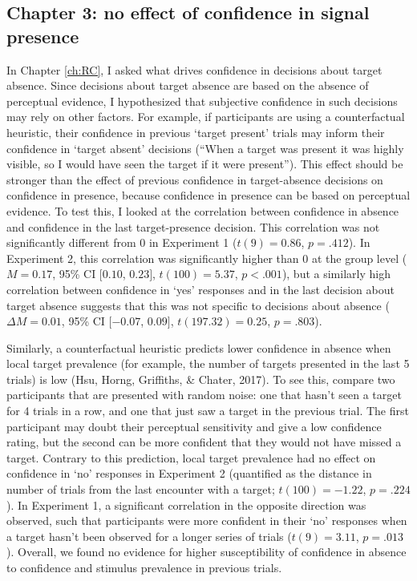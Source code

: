 \documentclass[12pt,twoside]{reedthesis}
\begin{document}
\hypertarget{chapter-3-no-effect-of-confidence-in-signal-presence}{%
\subsection*{Chapter 3: no effect of confidence in signal presence}\label{chapter-3-no-effect-of-confidence-in-signal-presence}}

In Chapter \ref{ch:RC}, I asked what drives confidence in decisions about target absence. Since decisions about target absence are based on the absence of perceptual evidence, I hypothesized that subjective confidence in such decisions may rely on other factors. For example, if participants are using a counterfactual heuristic, their confidence in previous `target present' trials may inform their confidence in `target absent' decisions (``When a target was present it was highly visible, so I would have seen the target if it were present''). This effect should be stronger than the effect of previous confidence in target-absence decisions on confidence in presence, because confidence in presence can be based on perceptual evidence. To test this, I looked at the correlation between confidence in absence and confidence in the last target-presence decision. This correlation was not significantly different from 0 in Experiment 1 (\(t(9) = 0.86\), \(p = .412\)). In Experiment 2, this correlation was significantly higher than 0 at the group level (\(M = 0.17\), 95\% CI \([0.10\), \(0.23]\), \(t(100) = 5.37\), \(p < .001\)), but a similarly high correlation between confidence in `yes' responses and in the last decision about target absence suggests that this was not specific to decisions about absence (\(\Delta M = 0.01\), 95\% CI \([-0.07\), \(0.09]\), \(t(197.32) = 0.25\), \(p = .803\)).

Similarly, a counterfactual heuristic predicts lower confidence in absence when local target prevalence (for example, the number of targets presented in the last 5 trials) is low (Hsu, Horng, Griffiths, \& Chater, 2017). To see this, compare two participants that are presented with random noise: one that hasn't seen a target for 4 trials in a row, and one that just saw a target in the previous trial. The first participant may doubt their perceptual sensitivity and give a low confidence rating, but the second can be more confident that they would not have missed a target. Contrary to this prediction, local target prevalence had no effect on confidence in `no' responses in Experiment 2 (quantified as the distance in number of trials from the last encounter with a target; \(t(100) = -1.22\), \(p = .224\)). In Experiment 1, a significant correlation in the opposite direction was observed, such that participants were more confident in their `no' responses when a target hasn't been observed for a longer series of trials (\(t(9) = 3.11\), \(p = .013\)). Overall, we found no evidence for higher susceptibility of confidence in absence to confidence and stimulus prevalence in previous trials.
\end{document}
